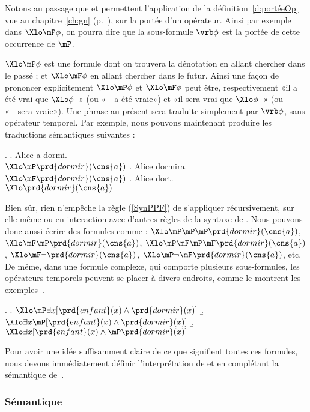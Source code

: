 Notons au passage que {\Xlo\mP} et {\Xlo\mF}
permettent l'application de la 
définition~\ref{d:portéeOp} vue au chapitre~\ref{ch:gn}
(p.~\pageref{d:portéeOp}), sur la portée d'un opérateur.  Ainsi par
exemple dans $\Xlo\mP\phi$,  on pourra dire que la sous-formule $\vrb\phi$ est
la portée de cette occurrence de $\mP$.


$\Xlo\mP \phi$ est une formule dont on trouvera la dénotation en
allant chercher dans le passé ;  et $\Xlo\mF \phi$ en allant chercher dans
le futur. Ainsi une façon de prononcer explicitement $\Xlo\mP \phi$ et $\Xlo\mF \phi$ peut être, respectivement «il a été vrai que $\Xlo\phi$~» (ou «~\vrb\phi\ a été vraie») et «il sera vrai que $\Xlo\phi$~» (ou «~\vrb\phi\ sera vraie»). 
Une phrase au présent sera traduite simplement par $\vrb\phi$, sans
opérateur temporel.
Par exemple, nous pouvons maintenant produire les traductions sémantiques suivantes :

\ex.
\a. Alice a dormi.
\\\(\Xlo\mP\prd{dormir}(\cns{a})\)
\b. Alice dormira.
\\\(\Xlo\mF \prd{dormir}(\cns{a})\)
\b. Alice dort.
\\\(\Xlo\prd{dormir}(\cns{a})\)



Bien sûr, rien n'empêche la règle (\RSyn\ref{SynPPF}) de s'appliquer récursivement, sur elle-même ou en interaction avec d'autres règles de la syntaxe de {\LO}. Nous pouvons donc aussi écrire des formules comme : \(\Xlo\mP\mP\mP\prd{dormir}(\cns{a})\), \(\Xlo\mF\mP\prd{dormir}(\cns{a})\), \(\Xlo\mP\mF\mP\mF\prd{dormir}(\cns{a})\), \(\Xlo\mF\neg\prd{dormir}(\cns{a})\), \(\Xlo\mP\neg\mF\prd{dormir}(\cns{a})\), etc.
De même, dans une formule complexe, qui comporte plusieurs sous-formules, les opérateurs temporels peuvent se placer à divers endroits, comme le montrent les exemples~\Next.



\ex.
\a. \(\Xlo\mP\exists x [\prd{enfant}(x) \wedge \prd{dormir}(x)]\)
\b. \(\Xlo\exists x \mP[\prd{enfant}(x) \wedge \prd{dormir}(x)]\)
\b. \(\Xlo\exists x [\prd{enfant}(x) \wedge \mP\prd{dormir}(x)]\)


Pour avoir une idée suffisamment claire de ce que signifient toutes ces formules, nous devons immédiatement définir l'interprétation de 
{\Xlo\mP} et {\Xlo\mF} en complétant la sémantique de~{\LO}.

\subsubsection{Sémantique}

